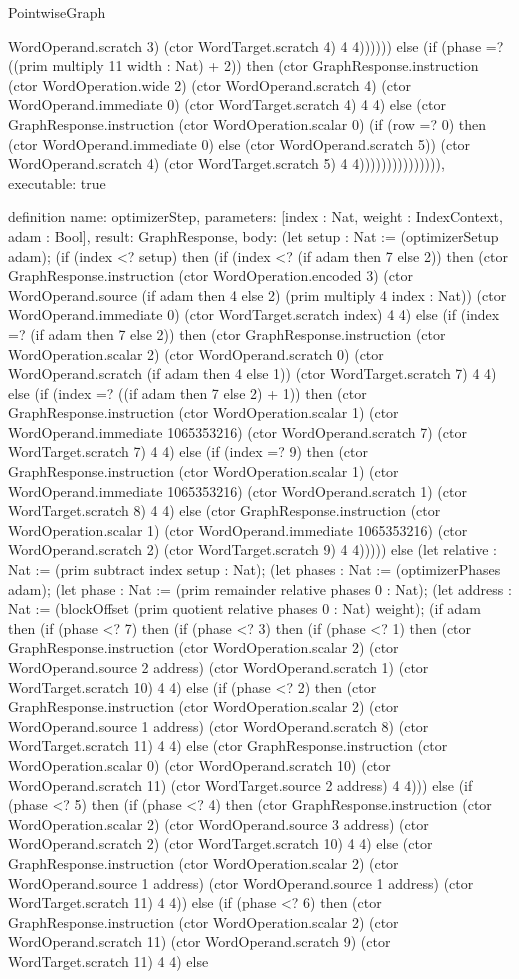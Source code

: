 \begin{lexlean}{PointwiseGraph}
\begin{semanticmodule}
{WordOperand.scratch 3) (ctor WordTarget.scratch 4) 4 4)))))) else (if (phase =? ((prim multiply 11 width : Nat) + 2)) then (ctor GraphResponse.instruction (ctor WordOperation.wide 2) (ctor WordOperand.scratch 4) (ctor WordOperand.immediate 0) (ctor WordTarget.scratch 4) 4 4) else (ctor GraphResponse.instruction (ctor WordOperation.scalar 0) (if (row =? 0) then (ctor WordOperand.immediate 0) else (ctor WordOperand.scratch 5)) (ctor WordOperand.scratch 4) (ctor WordTarget.scratch 5) 4 4))))))))))))))),
  executable: true
}

definition{
  name: optimizerStep,
  parameters: [index : Nat, weight : IndexContext, adam : Bool],
  result: GraphResponse,
  body: (let setup : Nat := (optimizerSetup adam); (if (index <? setup) then (if (index <? (if adam then 7 else 2)) then (ctor GraphResponse.instruction (ctor WordOperation.encoded 3) (ctor WordOperand.source (if adam then 4 else 2) (prim multiply 4 index : Nat)) (ctor WordOperand.immediate 0) (ctor WordTarget.scratch index) 4 4) else (if (index =? (if adam then 7 else 2)) then (ctor GraphResponse.instruction (ctor WordOperation.scalar 2) (ctor WordOperand.scratch 0) (ctor WordOperand.scratch (if adam then 4 else 1)) (ctor WordTarget.scratch 7) 4 4) else (if (index =? ((if adam then 7 else 2) + 1)) then (ctor GraphResponse.instruction (ctor WordOperation.scalar 1) (ctor WordOperand.immediate 1065353216) (ctor WordOperand.scratch 7) (ctor WordTarget.scratch 7) 4 4) else (if (index =? 9) then (ctor GraphResponse.instruction (ctor WordOperation.scalar 1) (ctor WordOperand.immediate 1065353216) (ctor WordOperand.scratch 1) (ctor WordTarget.scratch 8) 4 4) else (ctor GraphResponse.instruction (ctor WordOperation.scalar 1) (ctor WordOperand.immediate 1065353216) (ctor WordOperand.scratch 2) (ctor WordTarget.scratch 9) 4 4))))) else (let relative : Nat := (prim subtract index setup : Nat); (let phases : Nat := (optimizerPhases adam); (let phase : Nat := (prim remainder relative phases 0 : Nat); (let address : Nat := (blockOffset (prim quotient relative phases 0 : Nat) weight); (if adam then (if (phase <? 7) then (if (phase <? 3) then (if (phase <? 1) then (ctor GraphResponse.instruction (ctor WordOperation.scalar 2) (ctor WordOperand.source 2 address) (ctor WordOperand.scratch 1) (ctor WordTarget.scratch 10) 4 4) else (if (phase <? 2) then (ctor GraphResponse.instruction (ctor WordOperation.scalar 2) (ctor WordOperand.source 1 address) (ctor WordOperand.scratch 8) (ctor WordTarget.scratch 11) 4 4) else (ctor GraphResponse.instruction (ctor WordOperation.scalar 0) (ctor WordOperand.scratch 10) (ctor WordOperand.scratch 11) (ctor WordTarget.source 2 address) 4 4))) else (if (phase <? 5) then (if (phase <? 4) then (ctor GraphResponse.instruction (ctor WordOperation.scalar 2) (ctor WordOperand.source 3 address) (ctor WordOperand.scratch 2) (ctor WordTarget.scratch 10) 4 4) else (ctor GraphResponse.instruction (ctor WordOperation.scalar 2) (ctor WordOperand.source 1 address) (ctor WordOperand.source 1 address) (ctor WordTarget.scratch 11) 4 4)) else (if (phase <? 6) then (ctor GraphResponse.instruction (ctor WordOperation.scalar 2) (ctor WordOperand.scratch 11) (ctor WordOperand.scratch 9) (ctor WordTarget.scratch 11) 4 4) else }
\end{semanticmodule}
\end{lexlean}
